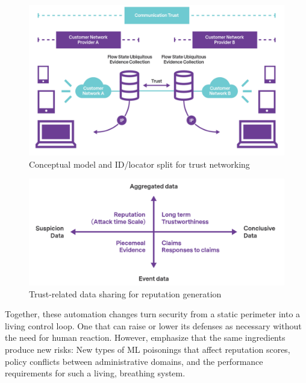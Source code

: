 \documentclass[acmtog]{acmart}
\begin{document}
\begin{figure}[h]
  \centering
  \includegraphics[width=\linewidth]{4.3_1.png}
  \caption{Conceptual model and ID/locator split for trust networking \cite{ref5}}
\end{figure}
\begin{figure}[h]
  \centering
  \includegraphics[width=\linewidth]{4.3_2.png}
  \caption{Trust-related data sharing for reputation generation \cite{ref5}}
\end{figure}
Together, these automation changes turn security from a static perimeter into a living control loop. One that can raise or lower its defenses as necessary without the need for human reaction. However, \cite{ref5} emphasize that the same ingredients produce new risks: New types of ML poisonings that affect reputation scores, policy conflicts between administrative domains, and the performance requirements for such a living, breathing system.
\end{document}
